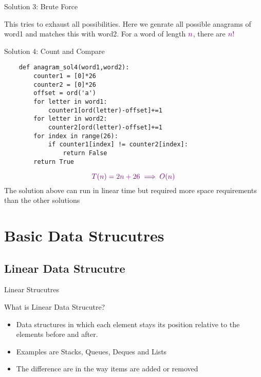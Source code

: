 \documentclass{beamer}
\begin{document}
\begin{frame}{Solution 3: Brute Force}
    \begin{block}{}
        This tries to exhaust all possibilities. Here we genrate all possible anagrams of \alert{word1} and matches this with \alert{word2}. For a word of length $\color{violet} n$, there are $\color{violet}n!$
    \end{block}
    
\end{frame}

\begin{frame}[fragile]{Solution 4: Count and Compare}
    \begin{lstlisting}
    def anagram_sol4(word1,word2):
        counter1 = [0]*26
        counter2 = [0]*26
        offset = ord('a')
        for letter in word1:
            counter1[ord(letter)-offset]+=1
        for letter in word2:
            counter2[ord(letter)-offset]+=1
        for index in range(26):
            if counter1[index] != counter2[index]:
                return False
        return True
    \end{lstlisting}
    \pause
    \begin{block}{}
        \[\color{violet} T(n) = 2n + 26 \implies O(n) \]
        The solution above can run in linear time but required more space requirements than the other solutions
    \end{block}
    
\end{frame}

\section{Basic Data Strucutres}
\subsection{Linear Data Strucutre}
\begin{frame}{Linear Strucutres}
    \begin{alertblock}{What is Linear Data Strucutre?}
        \begin{itemize}
            \item Data structures in which each element stays its position relative to the elements before and after.
            \item Examples are Stacks, Queues, Deques and Lists
            \item The difference are in the way items are added or removed
        \end{itemize}
    \end{alertblock}
\end{frame}
\end{document}
